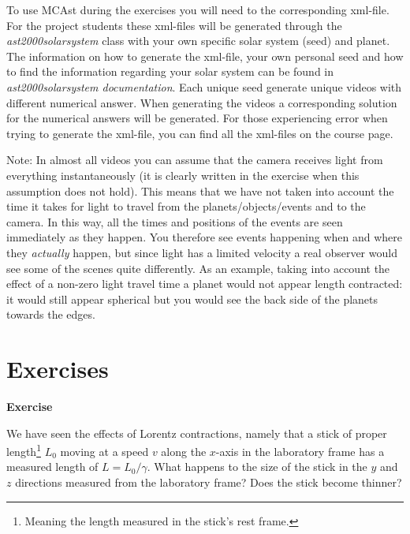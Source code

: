 {\begin{multicols}{2}
To use MCAst during the exercises you will need to the corresponding xml-file. For the project students these xml-files will be generated through the \textit{ast2000solarsystem} class with your own specific solar system (seed) and planet. The information on how to generate the xml-file, your own personal seed and how to find the information regarding your solar system can be found in \textit{ast2000solarsystem documentation}. Each unique seed generate unique videos with different numerical answer. When generating the videos a corresponding solution for the numerical answers will be generated. For those experiencing error when trying to generate the xml-file, you can find all the xml-files on the course page.

Note: In almost all videos you can assume that the camera receives light from everything instantaneously (it is clearly written in the exercise when this assumption does not hold). This means that we have not taken into account the time it takes for light to travel from the planets/objects/events and to the camera. In this way, all the times and positions of the events are seen immediately as they happen. You therefore see events happening when and where they {\it actually} happen, but since light has a limited velocity a real observer would see some of the scenes quite differently. As an example, taking into account the effect of a non-zero light travel time a planet would not appear length contracted: it would still appear spherical but you would see the back side of the planets towards the edges.




\newpage

\pagestyle{headings}
\section{Exercises}
\newcommand{\newproblem}[1]{\label{#1}{\bf Exercise \refproblem{#1}}}

\newproblem{prob:lorentzyz}

We have seen the effects of Lorentz contractions, namely that a stick of proper length\footnote{Meaning the length measured in the stick's rest frame.} $L_0$ moving at a speed $v$ along the $x$-axis in the laboratory frame has a measured length of $L = L_0/\gamma$. What happens to the size of the stick in the $y$ and $z$ directions measured from the laboratory frame? Does the stick become thinner?


\end{multicols}}
